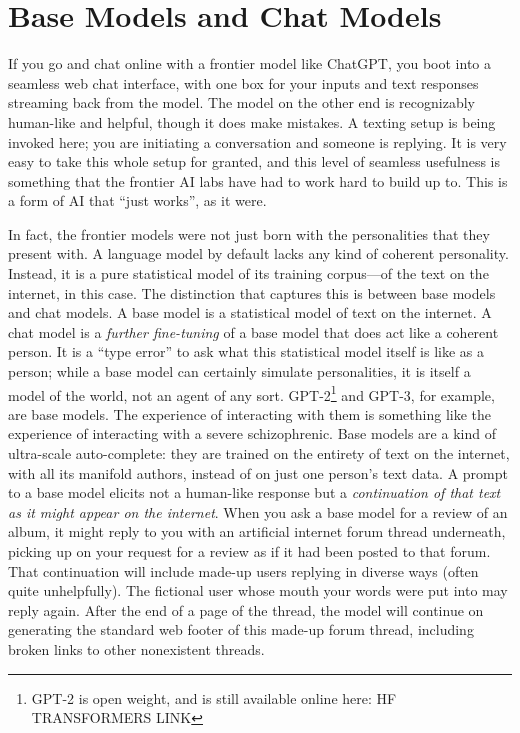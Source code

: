 \section{Base Models and Chat Models}
If you go and chat online with a frontier model like ChatGPT, you boot into a
seamless web chat interface, with one box for your inputs and text responses
streaming back from the model. The model on the other end is recognizably
human-like and helpful, though it does make mistakes. A texting setup is being
invoked here; you are initiating a conversation and someone is replying. It is
very easy to take this whole setup for granted, and this level of seamless
usefulness is something that the frontier AI labs have had to work hard to
build up to. This is a form of AI that ``just works'', as it were.

In fact, the frontier models were not just born with the personalities that
they present with. A language model by default lacks any kind of coherent
personality. Instead, it is a pure statistical model of its training
corpus---of the text on the internet, in this case. The distinction that
captures this is between base models and chat models. A base model is a
statistical model of text on the internet. A chat model is a \emph{further
fine-tuning} of a base model that does act like a coherent person. It is a
``type error'' to ask what this statistical model itself is like as a person;
while a base model can certainly simulate personalities, it is itself a model
of the world, not an agent of any sort. GPT-2\footnote{GPT-2 is open weight,
and is still available online here: HF TRANSFORMERS LINK} and GPT-3, for
example, are base models. The experience of interacting with them is something
like the experience of interacting with a severe schizophrenic. Base models are
a kind of ultra-scale auto-complete: they are trained on the entirety of text
on the internet, with all its manifold authors, instead of on just one person's
text data. A prompt to a base model elicits not a human-like response but a
\emph{continuation of that text as it might appear on the internet}. When you
ask a base model for a review of an album, it might reply to you with an
artificial internet forum thread underneath, picking up on your request for a
review as if it had been posted to that forum. That continuation will include
made-up users replying in diverse ways (often quite unhelpfully). The fictional
user whose mouth your words were put into may reply again. After the end of a
page of the thread, the model will continue on generating the standard web
footer of this made-up forum thread, including broken links to other
nonexistent threads.

